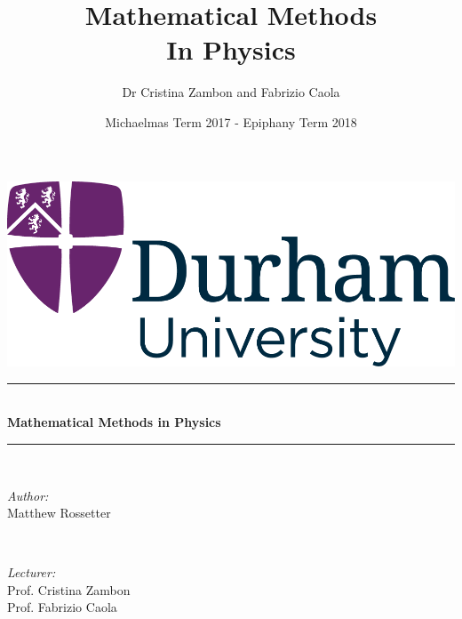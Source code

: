 \documentclass[a4paper, 11pt, normalem]{report}
\title{Mathematical Methods \\ In Physics \vspace{-20pt}}
\author{Dr Cristina Zambon and Fabrizio Caola}
\date{\vspace{-15pt}Michaelmas Term 2017 - Epiphany Term 2018}
\begin{document}
\begin{titlepage}
    \newcommand{\HRule}{\rule{\linewidth}{0.5mm}}
    \center
    {\includegraphics[scale=0.5]{../../logo0.png}\hfill{\Large\bfseries {}}}\\[4cm]
    \HRule \\[0.7cm]
    {\huge\bfseries Mathematical Methods in Physics}\\[0.4cm]
    \HRule \\[1.5cm]

    \begin{minipage}{0.4\textwidth}
        \begin{flushleft} \large
            \emph{Author:} \\ Matthew Rossetter
        \end{flushleft}
    \end{minipage}~
    \begin{minipage}{0.4\textwidth}
        \begin{flushright} \large
            \emph{Lecturer:} \\ Prof. Cristina Zambon \\ Prof. Fabrizio Caola
        \end{flushright}
    \end{minipage}\\[2cm]
    \vfill
\end{titlepage}

\part{}
\chapter{}
\end{document}
